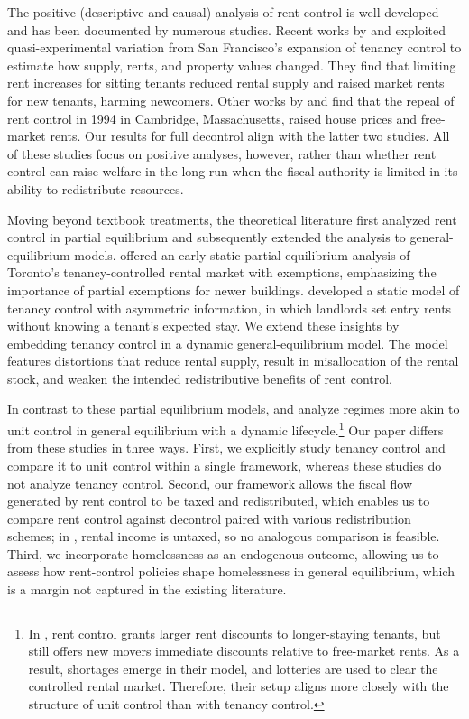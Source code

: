 \documentclass[parskip=full]{article}
\begin{document}
The positive (descriptive and causal) analysis of rent control is well developed and has been documented by numerous studies. Recent works by \citet{diamond-2019} and \citet{dmq-2019} exploited quasi-experimental variation from San Francisco’s expansion of tenancy control to estimate how supply, rents, and property values changed. They find that limiting rent increases for sitting tenants reduced rental supply and raised market rents for new tenants, harming newcomers. Other works by \citet{sims-2007} and \citet{app-2014} find that the repeal of rent control in 1994 in Cambridge, Massachusetts, raised house prices and free-market rents. Our results for full decontrol align with the latter two studies. All of these studies focus on positive analyses, however, rather than whether rent control can raise welfare in the long run when the fiscal authority is limited in its ability to redistribute resources.

Moving beyond textbook treatments, the theoretical literature first analyzed rent control in partial equilibrium and subsequently extended the analysis to general-equilibrium models. \citet{fallis-1985} offered an early static partial equilibrium analysis of Toronto’s tenancy-controlled rental market with exemptions, emphasizing the importance of partial exemptions for newer buildings. \citet{be-2000} developed a static model of tenancy control with asymmetric information, in which landlords set entry rents without knowing a tenant’s expected stay. We extend these insights by embedding tenancy control in a dynamic general-equilibrium model. The model features distortions that reduce rental supply, result in misallocation of the rental stock, and weaken the intended redistributive benefits of rent control.

In contrast to these partial equilibrium models, \citet{eric-1995} and \citet{fmn-2023} analyze regimes more akin to unit control in general equilibrium with a dynamic lifecycle.\footnote{In \citet{fmn-2023}, rent control grants larger rent discounts to longer-staying tenants, but still offers new movers immediate discounts relative to free-market rents. As a result, shortages emerge in their model, and lotteries are used to clear the controlled rental market. Therefore, their setup aligns more closely with the structure of unit control than with tenancy control.} Our paper differs from these studies in three ways. First, we explicitly study tenancy control and compare it to unit control within a single framework, whereas these studies do not analyze tenancy control. Second, our framework allows the fiscal flow generated by rent control to be taxed and redistributed, which enables us to compare rent control against decontrol paired with various redistribution schemes; in \citet{fmn-2023}, rental income is untaxed, so no analogous comparison is feasible. Third, we incorporate homelessness as an endogenous outcome, allowing us to assess how rent-control policies shape homelessness in general equilibrium, which is a margin not captured in the existing literature.
\end{document}
